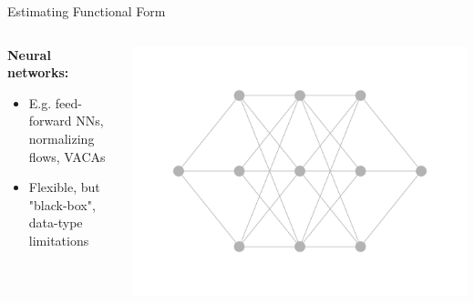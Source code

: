 \documentclass[onlytextwidth,english]{beamer}\usepackage[]{graphicx}\usepackage[]{xcolor}
\begin{document}
\begin{frame}{Estimating Functional Form}
\begin{columns}
\begin{column}{0.75\textwidth}
\textbf{Neural networks:}
\begin{itemize}
    \item E.g. feed-forward NNs, normalizing flows, VACAs
    \item Flexible, but "black-box", data-type limitations
\end{itemize}
\end{column}
\begin{column}{0.23\textwidth}
\includegraphics[width=\textwidth]{img/neural_network.png}
\end{column}
\end{columns}

\vspace{0.3cm}


\end{frame}
\end{document}
